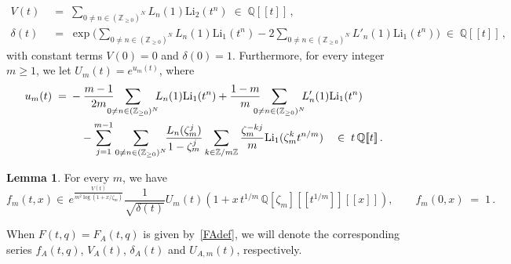 \documentclass[12pt,reqno]{amsart}
\theoremstyle{definition}
\newtheorem{lemma}[proposition]{Lemma}
\def\BZ{\mathbb Z}
\def\BQ{\mathbb Q}
\def\Li{\mathrm{Li}}
\def\be{\begin{equation}}
\def\ee{\end{equation}}
\def\z{\zeta}
\def\={\;=\;}
\def\inn{\;\in\;}
\def\Phitof{f}
\begin{document}
\begin{align}
\label{Vdef}
V(t) & \= \sum_{0\neq n\in(\BZ_{\geq0})^N} L_n(1) \Li_2(t^n) \inn \BQ[\![t]\!]\,,
\\
\label{tautdef}
\delta(t) & \= \exp\Big( \sum_{0\neq n\in(\BZ_{\geq0})^N} L_n(1) \Li_1(t^n)
-2 \sum_{0\neq n\in(\BZ_{\geq0})^N} L'_n(1) \Li_1(t^n) \Big) \inn\BQ[\![t]\!]\,,
\end{align}
with constant terms $V(0)=0$ and $\delta(0)=1$.
Furthermore, for every integer $m \geq 1$, we let $U_m(t)=e^{u_m(t)}$, where
\be
\label{Umdef}
\begin{aligned}
u_m(t)  \= &
- \frac{m-1}{2 m} \!\!\!\!\!\sum_{0\neq n\in(\BZ_{\geq0})^N}\!\!\! L_n(1) \Li_1(t^n)
+ \frac{1-m}{m} \!\!\!\!\!\sum_{0\neq n\in(\BZ_{\geq0})^N}\!\!\! L'_n(1) \Li_1(t^n)
\\ & \quad-\sum_{j=1}^{m-1} \sum_{0\neq n\in(\BZ_{\geq0})^N}\!\!
\frac{L_n(\z_m^j)}{1-\z_m^j}
\sum_{k\in\BZ/m\BZ}
\frac{\z_m^{-kj}}{m}
\Li_{1}(\z_m^{k}t^{n/m})
\quad\in\; t\thinspace\BQ[\![t]\!]\,.
\end{aligned}
\ee

\begin{lemma}
\label{lem.Phimexp}
For every $m$, we have 
\be
\label{Phiexp}
\Phitof_m(t,x) \in \, e^{\frac{V(t)}{m^2 \log(1+x/\z_m)}} \frac{1}{\sqrt{\delta(t)}}
U_m(t)
(1 + x\, t^{1/m} \,\BQ[\z_m][\![t^{1/m}]\!][\![x]\!]), \qquad \Phitof_m(0,x) \=1 \,.
\ee
\end{lemma}

When $F(t,q)=F_A(t,q)$ is given by~\eqref{FAdef}, we will
denote the corresponding series $\Phitof_A(t,q)$, $V_A(t)$, $\delta_A(t)$ and
$U_{A,m}(t)$,
respectively.
\end{document}
